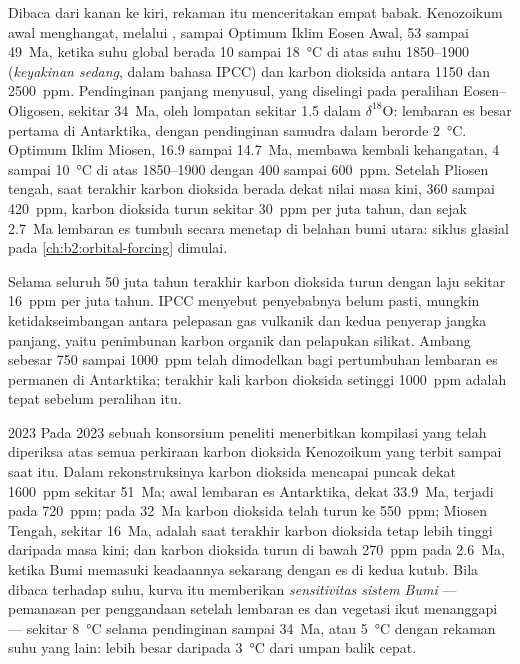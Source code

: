 Dibaca dari kanan ke kiri, rekaman itu menceritakan empat babak. Kenozoikum awal menghangat, melalui
, sampai Optimum Iklim Eosen Awal, 53 sampai \qty{49}{Ma}, ketika
suhu global berada 10 sampai \qty{18}{\celsius} di atas suhu 1850--1900 (\emph{keyakinan
sedang}, dalam bahasa IPCC) dan karbon dioksida antara 1150 dan \qty{2500}{ppm}.
Pendinginan panjang menyusul, yang diselingi pada peralihan Eosen--Oligosen, sekitar \qty{34}{Ma}, oleh
lompatan sekitar \qty{1.5}{\permil} dalam $\delta^{18}$O: lembaran es besar pertama di Antarktika, dengan
pendinginan samudra dalam berorde \qty{2}{\celsius}. Optimum Iklim Miosen, 16.9 sampai
\qty{14.7}{Ma}, membawa kembali kehangatan, 4 sampai \qty{10}{\celsius} di atas 1850--1900 dengan 400 sampai
\qty{600}{ppm}. Setelah Pliosen tengah, saat terakhir karbon dioksida berada dekat nilai masa kini, 360 sampai
\qty{420}{ppm}, karbon dioksida turun sekitar \qty{30}{ppm} per juta tahun, dan sejak \qty{2.7}{Ma} lembaran es
tumbuh secara menetap di belahan bumi utara: siklus glasial pada \cref{ch:b2:orbital-forcing} dimulai.

Selama seluruh 50 juta tahun terakhir karbon dioksida turun dengan laju sekitar \qty{16}{ppm} per juta
tahun. IPCC menyebut penyebabnya belum pasti, mungkin ketidakseimbangan antara pelepasan gas vulkanik dan
kedua penyerap jangka panjang, yaitu penimbunan karbon organik dan pelapukan silikat. Ambang sebesar 750 sampai
\qty{1000}{ppm} telah dimodelkan bagi pertumbuhan lembaran es permanen di Antarktika; terakhir kali
karbon dioksida setinggi \qty{1000}{ppm} adalah tepat sebelum peralihan itu.

\begin{dated}{2023}
Pada 2023 sebuah konsorsium peneliti menerbitkan kompilasi yang telah diperiksa atas semua perkiraan karbon
dioksida Kenozoikum yang terbit sampai saat itu. Dalam rekonstruksinya karbon dioksida mencapai puncak dekat \qty{1600}{ppm} sekitar
\qty{51}{Ma}; awal lembaran es Antarktika, dekat \qty{33.9}{Ma}, terjadi pada \qty{720}{ppm}; pada
\qty{32}{Ma} karbon dioksida telah turun ke \qty{550}{ppm}; Miosen Tengah, sekitar \qty{16}{Ma}, adalah saat
terakhir karbon dioksida tetap lebih tinggi daripada masa kini; dan karbon dioksida turun di bawah \qty{270}{ppm} pada \qty{2.6}{Ma}, ketika Bumi
memasuki keadaannya sekarang dengan es di kedua kutub. Bila dibaca terhadap suhu, kurva itu memberikan
\emph{sensitivitas sistem Bumi} --- pemanasan per penggandaan setelah lembaran es dan vegetasi
ikut menanggapi --- sekitar \qty{8}{\celsius} selama pendinginan sampai \qty{34}{Ma}, atau \qty{5}{\celsius}
dengan rekaman suhu yang lain: lebih besar daripada \qty{3}{\celsius} dari umpan balik cepat.
\end{dated}


